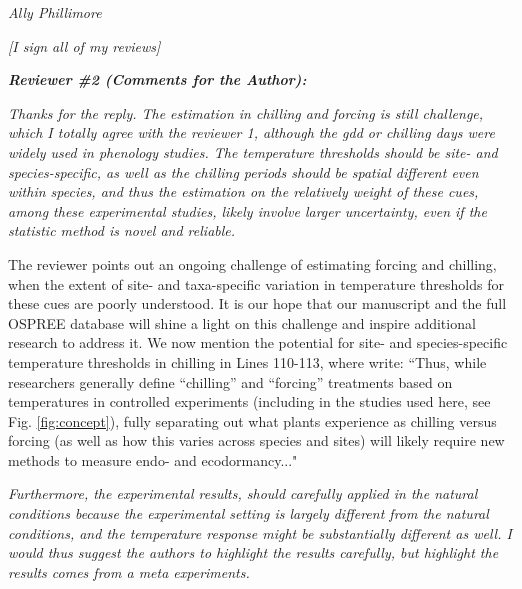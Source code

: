 \documentclass{article}
\begin{document}
\par \emph{Ally Phillimore}
\par \emph{[I sign all of my reviews]}


\par \emph{\bf{Reviewer \#2 (Comments for the Author):}}\\

\par \emph{Thanks for the reply. The estimation in chilling and forcing is still challenge, which I totally agree with the reviewer 1, although the gdd or chilling days were widely used in phenology studies. The temperature thresholds should be site- and species-specific, as well as the chilling periods should be spatial different even within species, and thus the estimation on the relatively weight of these cues, among these experimental studies, likely involve larger uncertainty, even if the statistic method is novel and reliable.}
\par The reviewer points out an ongoing challenge of estimating forcing and chilling, when the extent of site- and taxa-specific variation in temperature thresholds for these cues are poorly understood. It is our hope that our manuscript and the full OSPREE database will shine a light on this challenge and inspire additional research to address it. We now mention the potential for site- and species-specific temperature thresholds in chilling in Lines 110-113, where write:
``Thus, while researchers generally define ``chilling'' and ``forcing'' treatments based on temperatures in controlled experiments (including in the studies used here, see Fig. \ref{fig:concept}), fully separating out what plants experience as chilling versus forcing (as well as how this varies across species and sites) will likely require new methods to measure endo- and ecodormancy..."
\par \emph{Furthermore, the experimental results, should carefully applied in the natural conditions because the experimental setting is largely different from the natural conditions, and the temperature response might be substantially different as well. I would thus suggest the authors to highlight the results carefully, but highlight the results comes from a meta experiments.}
\end{document}
